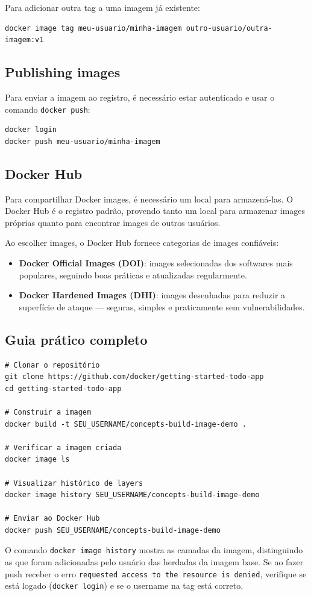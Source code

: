 Para adicionar outra tag a uma imagem já existente:

\begin{verbatim}
docker image tag meu-usuario/minha-imagem outro-usuario/outra-imagem:v1
\end{verbatim}

\subsection{Publishing images}

Para enviar a imagem ao registro, é necessário estar autenticado e usar o comando \texttt{docker push}:

\begin{verbatim}
docker login
docker push meu-usuario/minha-imagem
\end{verbatim}

\subsection{Docker Hub}

Para compartilhar Docker images, é necessário um local para armazená-las. O Docker Hub é o registro padrão, provendo tanto um local para armazenar images próprias quanto para encontrar images de outros usuários.

Ao escolher images, o Docker Hub fornece categorias de images confiáveis:

\begin{itemize}
    \item \textbf{Docker Official Images (DOI)}: images selecionadas dos softwares mais populares, seguindo boas práticas e atualizadas regularmente.
    \item \textbf{Docker Hardened Images (DHI)}: images desenhadas para reduzir a superfície de ataque --- seguras, simples e praticamente sem vulnerabilidades.
\end{itemize}

\subsection{Guia prático completo}

\begin{verbatim}
# Clonar o repositório
git clone https://github.com/docker/getting-started-todo-app
cd getting-started-todo-app

# Construir a imagem
docker build -t SEU_USERNAME/concepts-build-image-demo .

# Verificar a imagem criada
docker image ls

# Visualizar histórico de layers
docker image history SEU_USERNAME/concepts-build-image-demo

# Enviar ao Docker Hub
docker push SEU_USERNAME/concepts-build-image-demo
\end{verbatim}

O comando \texttt{docker image history} mostra as camadas da imagem, distinguindo as que foram adicionadas pelo usuário das herdadas da imagem base. Se ao fazer push receber o erro \texttt{requested access to the resource is denied}, verifique se está logado (\texttt{docker login}) e se o username na tag está correto.
